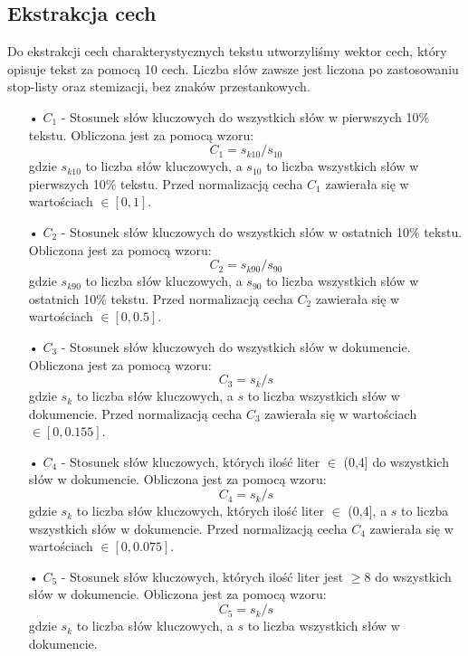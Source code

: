 \documentclass{classrep}
\begin{document}
\subsection{Ekstrakcja cech}
Do ekstrakcji cech charakterystycznych tekstu utworzyliśmy wektor cech, który opisuje tekst za pomocą 10 cech. Liczba słów zawsze jest liczona po zastosowaniu stop-listy oraz stemizacji, bez znaków przestankowych.
\begin{itemize}
\item[•] $C_1$ - Stosunek słów kluczowych do wszystkich słów w pierwszych 10\% tekstu. Obliczona jest za pomocą wzoru:
\begin{equation} C_1 = s_{k10} / s_{10}  \end{equation} gdzie $s_{k10}$ to liczba słów kluczowych, a $s_{10}$ to liczba wszystkich słów w pierwszych 10\% tekstu. Przed normalizacją cecha $C_{1}$ zawierała się w wartościach $\in [0,1]$.
\item[•] $C_2$ - Stosunek słów kluczowych do wszystkich słów w ostatnich 10\% tekstu. Obliczona jest za pomocą wzoru:
\begin{equation} C_2 = s_{k90} / s_{90}  \end{equation} gdzie $s_{k90}$ to liczba słów kluczowych, a $s_{90}$ to liczba wszystkich słów w ostatnich 10\% tekstu. Przed normalizacją cecha $C_{2}$ zawierała się w wartościach $\in [0,0.5]$.
\item[•] $C_3$ - Stosunek słów kluczowych do wszystkich słów w dokumencie. Obliczona jest za pomocą wzoru:
\begin{equation} C_3 = s_k / s  \end{equation} gdzie $s_k$ to liczba słów kluczowych, a $s$ to liczba wszystkich słów w dokumencie. 
Przed normalizacją cecha $C_{3}$ zawierała się w wartościach $\in [0,0.155]$.
\item[•] $C_4$ - Stosunek słów kluczowych, których ilość liter $\in$ (0,4] do wszystkich słów w dokumencie. Obliczona jest za pomocą wzoru:
\begin{equation} C_4 = s_k / s  \end{equation} gdzie $s_k$ to liczba słów kluczowych,  których ilość liter $\in$ (0,4], a $s$ to liczba wszystkich słów w dokumencie.
Przed normalizacją cecha $C_{4}$ zawierała się w wartościach $\in [0,0.075]$.
\item[•] $C_5$ - Stosunek słów kluczowych, których ilość liter jest $\geq$8 do wszystkich słów w dokumencie. Obliczona jest za pomocą wzoru:
\begin{equation} C_5 = s_k / s  \end{equation} gdzie $s_k$ to liczba słów kluczowych, a $s$ to liczba wszystkich słów w dokumencie.

\end{itemize}
\end{document}
